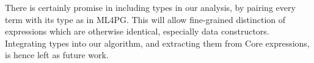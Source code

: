 There is certainly promise in including types in our analysis, by pairing every term with its type as in ML4PG. This will allow fine-grained distinction of expressions which are otherwise identical, especially data constructors. Integrating types into our algorithm, and extracting them from Core expressions, is hence left as future work.
